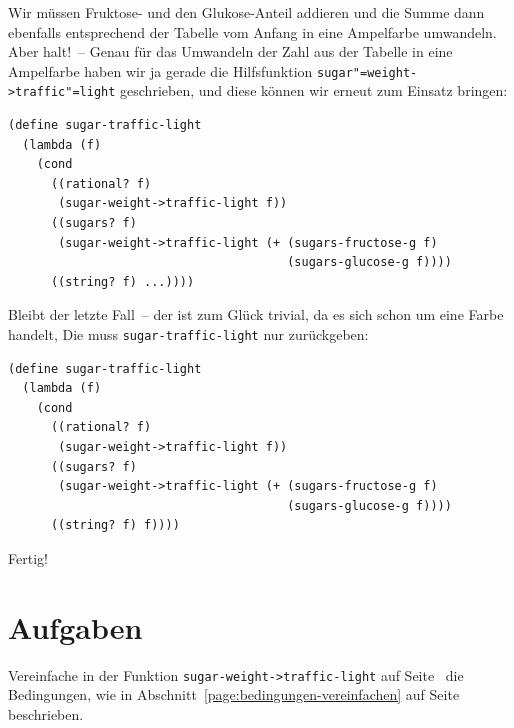 %
Wir müssen Fruktose- und den Glukose-Anteil addieren und die Summe
dann ebenfalls entsprechend der Tabelle vom Anfang in eine Ampelfarbe
umwandeln.  Aber halt!~-- Genau für das Umwandeln der Zahl aus der
Tabelle in eine Ampelfarbe haben wir ja gerade die Hilfsfunktion
\texttt{sugar"=weight->traffic"=light} geschrieben, und diese können wir
erneut zum Einsatz bringen:
%
\begin{verbatim}
(define sugar-traffic-light
  (lambda (f)
    (cond
      ((rational? f)
       (sugar-weight->traffic-light f))
      ((sugars? f)
       (sugar-weight->traffic-light (+ (sugars-fructose-g f)
                                       (sugars-glucose-g f))))
      ((string? f) ...))))
\end{verbatim}         
%
Bleibt der letzte Fall~-- der ist zum Glück trivial, da es sich schon
um eine Farbe handelt, Die muss \texttt{sugar-traffic-light} nur
zurückgeben:
%
\begin{verbatim}
(define sugar-traffic-light
  (lambda (f)
    (cond
      ((rational? f)
       (sugar-weight->traffic-light f))
      ((sugars? f)
       (sugar-weight->traffic-light (+ (sugars-fructose-g f)
                                       (sugars-glucose-g f))))
      ((string? f) f))))
\end{verbatim}         
%
Fertig!

\section*{Aufgaben}

\begin{aufgabe}
  Vereinfache in der Funktion \texttt{sugar-weight->traffic-light} auf
  Seite~\pageref{def:sugar-weight-traffic-light} die Bedingungen, wie
  in Abschnitt~\ref{page:bedingungen-vereinfachen} auf
  Seite~\pageref{page:bedingungen-vereinfachen} beschrieben.
\end{aufgabe}

